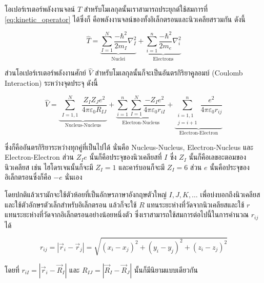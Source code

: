 โอเปอร์เรเตอร์พลังงานจลน์ $\hat{T}$ สำหรับโมเลกุลนั้นเราสามารถประยุกต์ใช้สมการที่ \eqref{eq:kinetic_operator} ได้ซึ่งก็%
คือพลังงานจลน์ของทั้งอิเล็กตรอนและนิวเคลียสรวมกัน ดังนี้

\begin{equation}
  \label{eq:kinetic_operator_molecule}
  \hat{T}
  =
  \underbrace
  {
    \sum_{I=1}^N \frac{-\hbar^2}{2 m_I} \nabla_I^2
  }_
  {
    \text{Nuclei}
  }
  + \underbrace
  {
    \sum_{i=1}^n \frac{-\hbar^2}{2 m_e} \nabla_i^2
  }_
  {
    \text{Electrons}
  }
\end{equation}

ส่วนโอเปอร์เรเตอร์พลังงานศักย์ $\hat{V}$ สำหรับโมเลกุลนั้นก็จะเป็นอันตรกิริยาคูลอมบ์ (Coulomb Interaction) ระหว่างจุดประจุ ดังนี้

\begin{equation}
  \label{eq:potential_operator_molecule}
  \hat{V}
  = \underbrace{
    \sum_{\substack{I=1,1}}^N \frac{Z_I Z_J e^2}{4 \pi \varepsilon_0 R_{I J}}
  }_
  {
    \text{Nucleus-Nucleus}
  }
  + \underbrace{
    \sum_{i=1}^n \sum_{I=1}^N \frac{-Z_I e^2}{4 \pi \varepsilon_0 r_{i I}}
  }_
  {
    \text{Electron-Nucleus}
  }
  + \underbrace{
    \sum_{\substack{i=1,1 \\ j=i+1}}^n \frac{e^2}{4 \pi \varepsilon_0 r_{i j}}
  }_
  {
    \text{Electron-Electron}
  }
\end{equation}

\noindent ซึ่งก็คืออันตรกิริยาระหว่างทุกคู่ที่เป็นไปได้ นั่นคือ Nucleus-Nucleus, Electron-Nucleus และ Electron-Electron
ส่วน $Z_{I} e$ นั้นก็คือประจุของนิวเคลียสที่ $I$ ซึ่ง $Z_{I}$ นั้นก็คือเลขอะตอมของนิวเคลียส เช่น ไฮโดรเจนนั้นก็จะมี $Z_{I} = 1$
และคาร์บอนก็จะมี $Z_{I} = 6$ ส่วน $e$ นั้นคือประจุของอิเล็กตรอนซึ่งก็คือ $-e$ นั่นเอง

โดยปกติแล้วเรามักจะใช้ตัวห้อยที่เป็นอักษรภาษาอังกฤษตัวใหญ่ $I, J, K, \ldots$ เพื่อบ่งบอกถึงนิวเคลียสและใช้ตัวอักษรตัวเล็กสำหรับอิเล็กตรอน
แล้วก็จะใช้ $R$ แทนระยะห่างที่วัดจากนิวเคลียสและใช้ $r$ แทนระยะห่างที่วัดจากอิเล็กตรอนอย่างน้อยหนึ่งตัว ซึ่งเราสามารถใช้สมการต่อไปนี้ในการคำนวณ
$r_{ij}$ ได้

\begin{equation}
  r_{ij}
  =
  |\vec{r}_i - \vec{r}_j|
  =
  \sqrt{(x_i-x_j)^2 + (y_i-y_j)^2 + (z_i-z_j)^2}
\end{equation}

\noindent โดยที่ $r_{iI} = |\vec{r}_i - \vec{R}_I|$ และ $R_{IJ} = |\vec{R}_I - \vec{R}_J|$ นั้นก็มีนิยามแบบเดียวกัน


